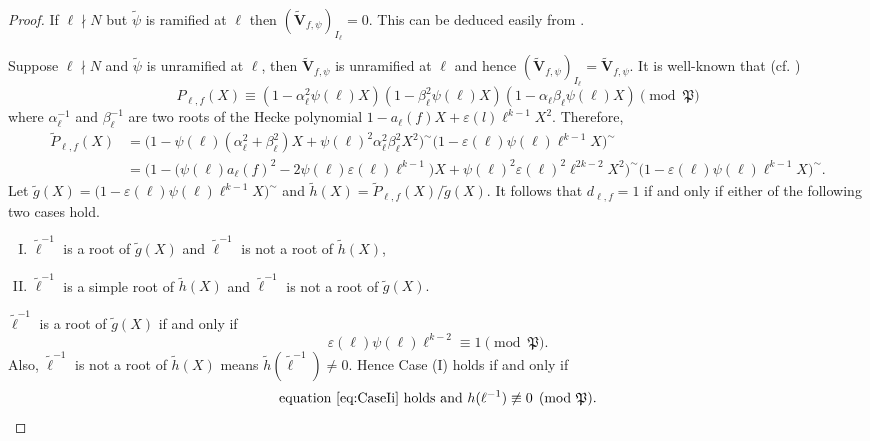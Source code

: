 \documentclass{amsart}
\newcommand{\bV}{\mathbf{V}}
\newtheorem{auxiliary proposition}[theorem]{Auxiliary Proposition}
\newtheorem{main conjecture}[theorem]{Main Conjecture}
\newtheorem{main theorem}[theorem]{Main Theorem}
\newtheorem{modesty proposition}[theorem]{Modesty Proposition}
\newtheorem{open problem}[theorem]{Open Problem}
\newtheorem{convergence lemma}[theorem]{Convergence Lemma}
\newtheorem{corrected lemma}[theorem]{Corrected Lemma}
\newtheorem{growth lemma}[theorem]{Growth Lemma}
\newtheorem{coefficient lemma}[theorem]{Integrality Lemma}
\newtheorem{interpolation lemma}[theorem]{Interpolation Lemma}
\newtheorem{kernel lemma}[theorem]{Kernel Lemma}
\newtheorem{limit lemma}[theorem]{Limit Lemma}
\newtheorem{tandem lemma}[theorem]{Modesty Lemma}
\newtheorem{zero-finding lemma}[theorem]{Zero-Finding Lemma}
\begin{document}
\begin{proof}
If $\ell \nmid N$ but $\tilde{\psi}$ is ramified at $\ell$ then 
$(\tilde{\bV}_{f, \psi})_{I_\ell} =0$. This can be deduced easily from \cite[last paragraph of page 255]{DiamondTaylor}.

Suppose $\ell \nmid N$ and $\tilde{\psi}$ is unramified at $\ell$, then $\tilde{\bV}_{f, \psi}$ is unramified at $\ell$ and hence $(\tilde{\bV}_{f, \psi})_{I_\ell} = \tilde{\bV}_{f, \psi}.$ It is well-known that (cf. \cite[Section 2.1]{LZ16})
    $$P_{\ell,f}(X)\equiv (1-\alpha_\ell^2\psi(\ell)X)(1-\beta_\ell^2\psi(\ell)X)(1-\alpha_\ell\beta_\ell \psi(\ell) X) \pmod{\mathfrak{P}}$$
    where $\alpha_\ell^{-1}$ and $\beta_\ell^{-1}$ are two roots of the Hecke polynomial $1-a_\ell(f)X +\varepsilon(l)\ell^{k-1}X^2.$
    Therefore, 
    \begin{align*}
       \tilde{P}_{\ell,f}(X)&=\Big(1-\psi(\ell)(\alpha_{\ell}^2+\beta_\ell^2)X+\psi(\ell)^2\alpha_\ell^2\beta_\ell^2X^2\Big)^{\sim} \Big(1-\varepsilon(\ell)\psi(\ell)\ell^{k-1}X\Big)^{\sim}\\
       &=\Big(1-\big(\psi(\ell)a_\ell(f)^2-2\psi(\ell)\varepsilon(\ell)\ell^{k-1}\big)X+\psi(\ell)^2\varepsilon(\ell)^2\ell^{2k-2}X^2\Big)^{\sim}\Big(1-\varepsilon(\ell)\psi(\ell)\ell^{k-1}X\Big)^{\sim}.
    \end{align*}
    Let $\tilde{g}(X)=\Big(1-\varepsilon(\ell)\psi(\ell)\ell^{k-1}X\Big)^{\sim}$ and $\tilde{h}(X)=\tilde{P}_{\ell,f}(X)/\tilde{g}(X)$.
    It follows that $d_{\ell,f}=1$ if and only if 
either of the following two cases hold.
\begin{enumerate}[(I)]
    \item $\tilde{\ell}^{-1}$ is a root of $\tilde{g}(X)$ and $\tilde{\ell}^{-1}$ is not a root of $\tilde{h}(X)$,
    \item $\tilde{\ell}^{-1}$ is a simple root of $\tilde{h}(X)$ and $\tilde{\ell}^{-1}$ is not a  root of $\tilde{g}(X).$
\end{enumerate}
 $\tilde{\ell}^{-1}$ is a root of $\tilde{g}(X)$ if and only if 
\begin{equation}\label{eq:CaseIi}
  \varepsilon(\ell)\psi(\ell)\ell^{k-2}\equiv 1 \pmod{\mathfrak{P}}.
\end{equation}
 Also, $\tilde{\ell}^{-1}$ is not a root of $\tilde{h}(X)$ means $\tilde{h}(\tilde{\ell}^{-1}) \neq 0.$ Hence Case (I) holds if and only if 
\begin{equation}\label{CaseI}
 \text{equation } \eqref{eq:CaseIi}  \text{ holds and }  h(\ell^{-1}) \not\equiv  0 \pmod{\mathfrak{P}}.
\end{equation}


\end{proof}
\end{document}
